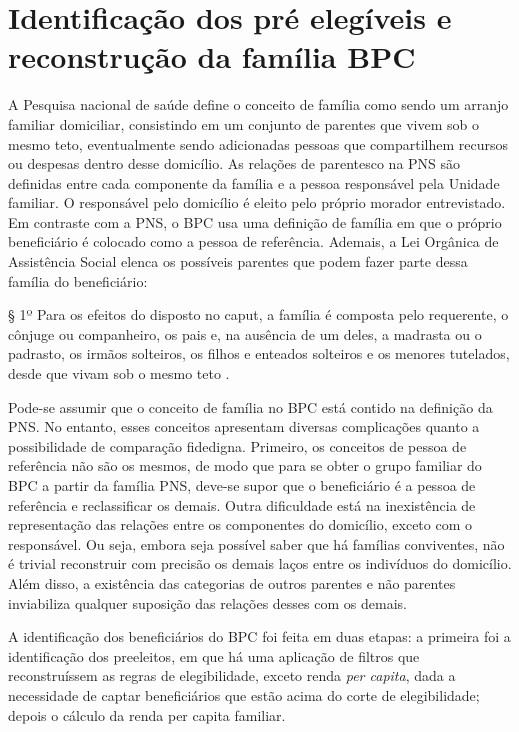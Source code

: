 \documentclass[
	12pt,				%
	openright,			%
	twoside,			%
	a4paper,			%
	english,			%
	french,				%
	spanish,			%
	brazil				%
	]{abntex2}
\begin{document}
	\section{Identificação dos pré elegíveis e reconstrução da família BPC}
	
	A Pesquisa nacional de saúde define o conceito de família como sendo um arranjo familiar domiciliar, consistindo em um conjunto de parentes que vivem sob o mesmo teto, eventualmente sendo adicionadas pessoas que compartilhem recursos ou despesas dentro desse domicílio. As relações de parentesco na PNS são definidas entre cada componente da família e a pessoa responsável pela Unidade familiar. O responsável pelo domicílio é eleito pelo próprio morador entrevistado. Em contraste com a PNS, o BPC usa uma definição de família em que o próprio beneficiário é colocado como a pessoa de referência. Ademais, a Lei Orgânica de Assistência Social elenca os possíveis parentes que podem fazer parte dessa família do beneficiário:
	
	\begin{citacao}
		§ 1º Para os efeitos do disposto no caput, a família é composta pelo requerente, o cônjuge ou companheiro, os pais e, na ausência de um deles, a madrasta ou o padrasto, os irmãos solteiros, os filhos e enteados solteiros e os menores tutelados, desde que vivam sob o mesmo teto \cite[art.20]{loas2011}.
	\end{citacao}
	
	Pode-se assumir que o conceito de família no BPC está contido na definição da PNS. No entanto, esses conceitos apresentam diversas complicações quanto a  possibilidade de comparação fidedigna. Primeiro, os conceitos de pessoa de referência não são os mesmos, de modo que para se obter o grupo familiar do BPC a partir da família PNS, deve-se supor que o beneficiário é a pessoa de referência e reclassificar os demais. Outra dificuldade está na inexistência de representação das relações entre os componentes do domicílio, exceto com o responsável. Ou seja, embora seja possível saber que há famílias conviventes, não é trivial reconstruir com precisão os demais laços entre os indivíduos do domicílio. Além disso, a existência das categorias de outros parentes e não parentes inviabiliza qualquer suposição das relações desses com os demais. 
	
	A identificação dos beneficiários do BPC foi feita em duas etapas: a primeira foi a identificação dos preeleitos, em que há uma aplicação de filtros que reconstruíssem as regras de elegibilidade, exceto renda \textit{per capita}, dada a necessidade de captar beneficiários que estão acima do corte de elegibilidade; depois o cálculo da renda per capita familiar.
	
\end{document}
